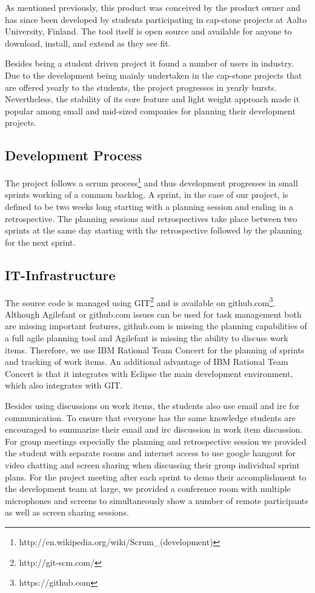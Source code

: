 As mentioned previously, this product was conceived by the product owner and has since been developed by students participating in cap-stone projects at Aalto University, Finland.
The tool itself is open source and available for anyone to download, install, and extend as they see fit.

Besides being a student driven project it found a number of users in industry.
Due to the development being mainly undertaken in the cap-stone projects that are offered yearly to the students, the project progresses in yearly bursts.
Nevertheless, the stability of its core feature and light weight approach made it popular among small and mid-sized companies for planning their development projects.

\subsection{Development Process}
The project follows a scrum process\footnote{http://en.wikipedia.org/wiki/Scrum\_(development)} and thus development progresses in small sprints working of a common backlog.
A sprint, in the case of our project, is defined to be two weeks long starting with a planning session and ending in a retrospective.
The planning sessions and retrospectives take place between two sprints at the same day starting with the retrospective followed by the planning for the next sprint.

\subsection{IT-Infrastructure}
The source code is managed using GIT\footnote{http://git-scm.com/} and is available on github.com\footnote{https://github.com}.
Although Agilefant or github.com issues can be used for task management both are missing important features, github.com is missing the planning capabilities of a full agile planning tool and Agilefant is missing the ability to discuss work items.
Therefore, we use IBM Rational Team Concert for the planning of sprints and tracking of work items.
An additional advantage of IBM Rational Team Concert is that  it integrates with Eclipse the main development environment, which also integrates with GIT. 

Besides using discussions on work items, the students also use email and irc for communication.
To ensure that everyone has the same knowledge students are encouraged to summarize their email and irc discussion in work item discussion.
For group meetings especially the planning and retrospective session we provided the student with separate rooms and internet access to use google hangout for video chatting and screen sharing when discussing their group individual sprint plans.
For the project meeting after each sprint to demo their accomplishment to the development team at large, we provided a conference room with multiple microphones and screens to simultaneously show a number of remote participants as well as screen sharing sessions. 

